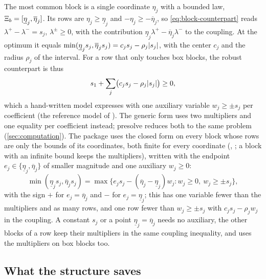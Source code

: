 The most common block is a single coordinate $\eta_j$ with a bounded law, $\Xi_{b} = [\underline\eta_j, \overline\eta_j]$.
Its rows are $\eta_j \ge \underline\eta_j$ and $-\eta_j \ge -\overline\eta_j$, so \eqref{eq:block-counterpart} reads
$\lambda^+ - \lambda^- = s_j$, $\lambda^\pm \ge 0$, with the contribution $\underline\eta_j\lambda^+ - \overline\eta_j\lambda^-$ to the coupling.
At the optimum it equals $\min(\underline\eta_j s_j, \overline\eta_j s_j) = c_j s_j - \rho_j\lvert s_j \rvert$,
with the center $c_j$ and the radius $\rho_j$ of the interval.
For a row that only touches box blocks, the robust counterpart is thus
\[
s_1 + \sum_j \bigl(c_j s_j - \rho_j \lvert s_j \rvert\bigr) \ge 0,
\]
which a hand-written model expresses with one auxiliary variable $w_j \ge \pm s_j$ per coefficient
(the reference model of ).
The generic form uses two multipliers and one equality per coefficient instead;
presolve reduces both to the same problem (\cref{sec:computation}).
The package uses the closed form on every block whose rows are only the bounds of its coordinates, both finite for every coordinate (, ; a block with an infinite bound keeps the multipliers), written with the endpoint $e_j \in \{\underline\eta_j, \overline\eta_j\}$ of smaller magnitude and one auxiliary $w_j \ge 0$:
\[
\min(\underline\eta_j s_j, \overline\eta_j s_j) = \max\bigl\{e_j s_j - (\overline\eta_j - \underline\eta_j) w_j : w_j \ge 0,\ w_j \ge \pm s_j\bigr\},
\]
with the sign $+$ for $e_j = \overline\eta_j$ and $-$ for $e_j = \underline\eta_j$;
this has one variable fewer than the multipliers and as many rows, and one row fewer than $w_j \ge \pm s_j$ with $c_j s_j - \rho_j w_j$ in the coupling.
A constant $s_j$ or a point $\underline\eta_j = \overline\eta_j$ needs no auxiliary, the other blocks of a row keep their multipliers in the same coupling inequality, and  uses the multipliers on box blocks too.

\subsection{What the structure saves}

